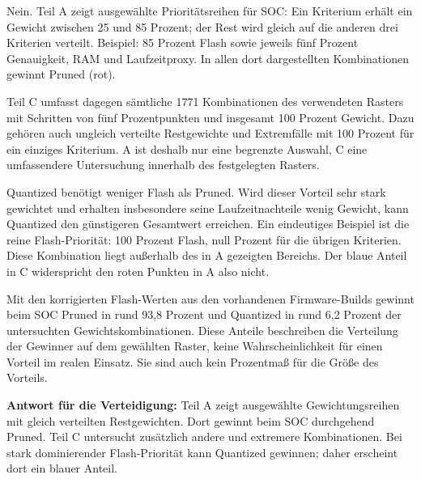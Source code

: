 Nein. Teil A zeigt ausgewählte Prioritätsreihen für SOC: Ein Kriterium erhält ein Gewicht zwischen 25 und 85 Prozent; der Rest wird gleich auf die anderen drei Kriterien verteilt. Beispiel: 85 Prozent Flash sowie jeweils fünf Prozent Genauigkeit, RAM und Laufzeitproxy. In allen dort dargestellten Kombinationen gewinnt Pruned (rot).

Teil C umfasst dagegen sämtliche 1771 Kombinationen des verwendeten Rasters mit Schritten von fünf Prozentpunkten und insgesamt 100 Prozent Gewicht. Dazu gehören auch ungleich verteilte Restgewichte und Extremfälle mit 100 Prozent für ein einziges Kriterium. A ist deshalb nur eine begrenzte Auswahl, C eine umfassendere Untersuchung innerhalb des festgelegten Rasters.

Quantized benötigt weniger Flash als Pruned. Wird dieser Vorteil sehr stark gewichtet und erhalten insbesondere seine Laufzeitnachteile wenig Gewicht, kann Quantized den günstigeren Gesamtwert erreichen. Ein eindeutiges Beispiel ist die reine Flash-Priorität: 100 Prozent Flash, null Prozent für die übrigen Kriterien. Diese Kombination liegt außerhalb des in A gezeigten Bereichs. Der blaue Anteil in C widerspricht den roten Punkten in A also nicht.

Mit den korrigierten Flash-Werten aus den vorhandenen Firmware-Builds gewinnt beim SOC Pruned in rund 93,8 Prozent und Quantized in rund 6,2 Prozent der untersuchten Gewichtskombinationen. Diese Anteile beschreiben die Verteilung der Gewinner auf dem gewählten Raster, keine Wahrscheinlichkeit für einen Vorteil im realen Einsatz. Sie sind auch kein Prozentmaß für die Größe des Vorteils.

\textbf{Antwort für die Verteidigung:} Teil A zeigt ausgewählte Gewichtungsreihen mit gleich verteilten Restgewichten. Dort gewinnt beim SOC durchgehend Pruned. Teil C untersucht zusätzlich andere und extremere Kombinationen. Bei stark dominierender Flash-Priorität kann Quantized gewinnen; daher erscheint dort ein blauer Anteil.
